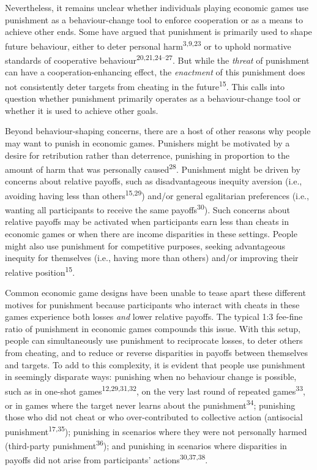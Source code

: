 \documentclass[
  man,floatsintext]{apa6}
\begin{document}
Nevertheless, it remains unclear whether individuals playing economic games use
punishment as a behaviour-change tool to enforce cooperation or as a means to
achieve other ends. Some have argued that punishment is primarily used to shape
future behaviour, either to deter personal harm\textsuperscript{3,9,23} or to uphold normative standards of cooperative behaviour\textsuperscript{20,21,24--27}.
But while the \emph{threat} of punishment can have a cooperation-enhancing effect,
the \emph{enactment} of this punishment does not consistently deter targets from
cheating in the future\textsuperscript{15}. This calls into question whether
punishment primarily operates as a behaviour-change tool or whether it is used
to achieve other goals.

Beyond behaviour-shaping concerns, there are a host of other reasons why people
may want to punish in economic games. Punishers might be motivated by a desire
for retribution rather than deterrence, punishing in proportion to the amount
of harm that was personally caused\textsuperscript{28}. Punishment might be driven
by concerns about relative payoffs, such as disadvantageous inequity aversion
(i.e., avoiding having less than others\textsuperscript{15,29}) and/or
general egalitarian preferences (i.e., wanting all participants to receive the
same payoffs\textsuperscript{30}). Such concerns about relative payoffs may be activated
when participants earn less than cheats in economic games or when there are
income disparities in these settings. People might also use punishment for
competitive purposes, seeking advantageous inequity for themselves (i.e., having
more than others) and/or improving their relative position\textsuperscript{15}.

Common economic game designs have been unable to tease apart these different
motives for punishment because participants who interact with cheats in these
games experience both losses \emph{and} lower relative payoffs. The typical 1:3
fee-fine ratio of punishment in economic games compounds this issue. With
this setup, people can simultaneously use punishment to reciprocate losses, to
deter others from cheating, and to reduce or reverse disparities in payoffs
between themselves and targets. To add to this complexity, it is evident that
people use punishment in seemingly disparate ways: punishing when no behaviour
change is possible, such as in one-shot games\textsuperscript{12,29,31,32}, on the very last round of repeated games\textsuperscript{33}, or in games where the target never learns about the
punishment\textsuperscript{34}; punishing those who did not cheat or who
over-contributed to collective action (antisocial punishment\textsuperscript{17,35}); punishing in scenarios where they were not
personally harmed (third-party punishment\textsuperscript{36}); and punishing in
scenarios where disparities in payoffs did not arise from participants'
actions\textsuperscript{30,37,38}.
\end{document}
